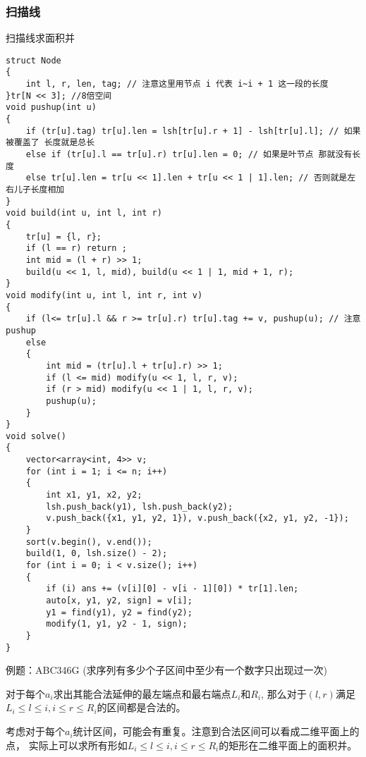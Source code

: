 \documentclass[a4paper, fontset=none]{ctexart}
\begin{document}
\subsubsection{扫描线}
扫描线求面积并
\begin{verbatim}
struct Node
{
    int l, r, len, tag; // 注意这里用节点 i 代表 i~i + 1 这一段的长度
}tr[N << 3]; //8倍空间
void pushup(int u)
{
    if (tr[u].tag) tr[u].len = lsh[tr[u].r + 1] - lsh[tr[u].l]; // 如果被覆盖了 长度就是总长
    else if (tr[u].l == tr[u].r) tr[u].len = 0; // 如果是叶节点 那就没有长度
    else tr[u].len = tr[u << 1].len + tr[u << 1 | 1].len; // 否则就是左右儿子长度相加
}
void build(int u, int l, int r)
{
    tr[u] = {l, r};
    if (l == r) return ;
    int mid = (l + r) >> 1;
    build(u << 1, l, mid), build(u << 1 | 1, mid + 1, r);
}
void modify(int u, int l, int r, int v)
{
    if (l<= tr[u].l && r >= tr[u].r) tr[u].tag += v, pushup(u); // 注意 pushup
    else
    {
        int mid = (tr[u].l + tr[u].r) >> 1;
        if (l <= mid) modify(u << 1, l, r, v);
        if (r > mid) modify(u << 1 | 1, l, r, v);
        pushup(u);
    }
}
void solve()
{
    vector<array<int, 4>> v;
    for (int i = 1; i <= n; i++)
    {
        int x1, y1, x2, y2;
        lsh.push_back(y1), lsh.push_back(y2);
        v.push_back({x1, y1, y2, 1}), v.push_back({x2, y1, y2, -1});
    }
    sort(v.begin(), v.end());
    build(1, 0, lsh.size() - 2);
    for (int i = 0; i < v.size(); i++)
    {
        if (i) ans += (v[i][0] - v[i - 1][0]) * tr[1].len;
        auto[x, y1, y2, sign] = v[i];
        y1 = find(y1), y2 = find(y2);
        modify(1, y1, y2 - 1, sign);
    }
}
\end{verbatim}

例题：ABC346G (求序列有多少个子区间中至少有一个数字只出现过一次)

对于每个$a_i$求出其能合法延伸的最左端点和最右端点$L_i$和$R_i$,
那么对于$(l, r)$满足$L_i\leqslant l\leqslant i, i\leqslant r\leqslant R_i$的区间都是合法的。

考虑对于每个$a_i$统计区间，可能会有重复。注意到合法区间可以看成二维平面上的点，
实际上可以求所有形如$L_i\leqslant l\leqslant i, i\leqslant r\leqslant R_i$的矩形在二维平面上的面积并。
\end{document}
